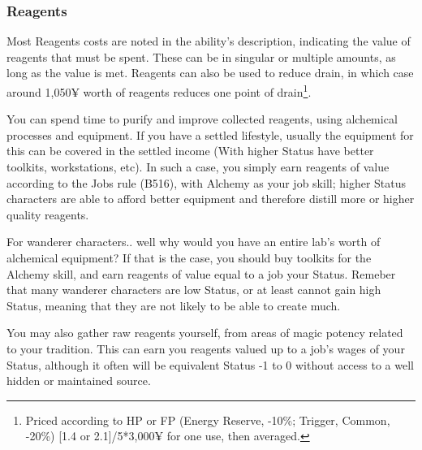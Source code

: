 \begin{multicols*}{2}
	\subsubsection{Reagents}
	
	Most Reagents costs are noted in the ability's description, indicating the value of reagents that must be spent. These can be in singular or multiple amounts, as long as the value is met. Reagents can also be used to reduce drain, in which case around 1,050¥ worth of reagents reduces one point of drain\footnote{Priced according to HP or FP (Energy Reserve, -10\%; Trigger, Common, -20\%) [1.4 or 2.1]/5*3,000¥ for one use, then averaged.}.
	
	You can spend time to purify and improve collected reagents, using alchemical processes and equipment. If you have a settled lifestyle, usually the equipment for this can be covered in the settled income (With higher Status have better toolkits, workstations, etc). In such a case, you simply earn reagents of value according to the Jobs rule (B516), with Alchemy as your job skill; higher Status characters are able to afford better equipment and therefore distill more or higher quality reagents. 
	
	For wanderer characters.. well why would you have an entire lab's worth of alchemical equipment? If that is the case, you should buy toolkits for the Alchemy skill, and earn reagents of value equal to a job your Status. Remeber that many wanderer characters are low Status, or at least cannot gain high Status, meaning that they are not likely to be able to create much.
	
	You may also gather raw reagents yourself, from areas of magic potency related to your tradition. This can earn you reagents valued up to a job's wages of your Status, although it often will be equivalent Status -1 to 0 without access to a well hidden or maintained source.
	
\end{multicols*}